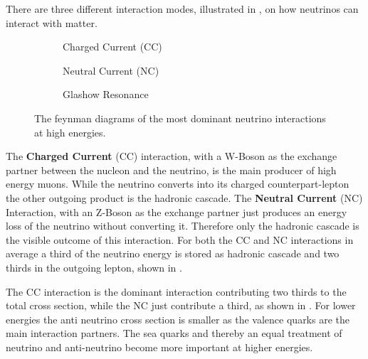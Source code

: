 There are three different interaction modes, illustrated in , on how neutrinos can interact with matter.
\begin{figure}
    \begin{subfigure}{0.31\textwidth}
        \centering
        
        \caption{Charged Current (CC)}
        \label{fig:feyn_nu_cc}
    \end{subfigure}
    \hfill
    \begin{subfigure}{0.31\textwidth}
        \centering
        
        \caption{Neutral Current (NC)}
        \label{fig:feyn_nu_nc}
    \end{subfigure}
    \hfill
    \begin{subfigure}{0.31\textwidth}
        \centering
        
        \caption{Glashow Resonance}
        \label{fig:feyn_glashow}
    \end{subfigure}
    \caption{The feynman diagrams of the most dominant neutrino interactions at high energies.}
    \label{fig:feyn_nu}
\end{figure}

The \textbf{Charged Current} (CC) interaction, with a W-Boson as the exchange partner between the nucleon and the neutrino, is the main producer of high energy muons.
While the neutrino converts into its charged counterpart-lepton the other outgoing product is the hadronic cascade.
The \textbf{Neutral Current} (NC) Interaction, with an Z-Boson as the exchange partner just produces an energy loss of the neutrino without converting it.
Therefore only the hadronic cascade is the visible outcome of this interaction.
For both the CC and NC interactions in average a third of the neutrino energy is stored as hadronic cascade and two thirds in the outgoing lepton, shown in .

The CC interaction is the dominant interaction contributing two thirds to the total cross section, while the NC just contribute a third, as shown in .
For lower energies the anti neutrino cross section is smaller as the valence quarks are the main interaction partners.
The sea quarks and thereby an equal treatment of neutrino and anti-neutrino become more important at higher energies.

